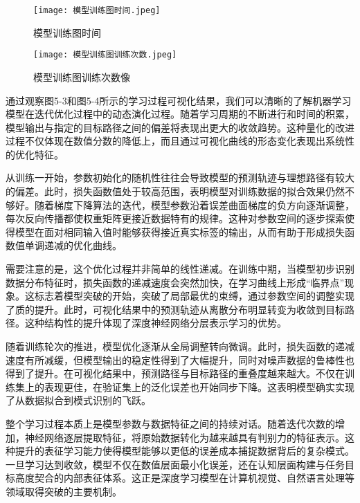 \begin{figure}[hbt]
	\centering
	\texttt{[image: 模型训练图时间.jpeg]}
	\caption{模型训练图时间}
	\label{f.example}
\end{figure}


\begin{figure}[hbt]
	\centering
	\texttt{[image: 模型训练图训练次数.jpeg]}
	\caption{模型训练图训练次数像}
	\label{f.example}
\end{figure}

通过观察图5-3和图5-4所示的学习过程可视化结果，我们可以清晰的了解机器学习模型在迭代优化过程中的动态演化过程。随着学习周期的不断进行和时间的积累，模型输出与指定的目标路径之间的偏差将表现出更大的收敛趋势。这种量化的改进过程不仅体现在数值分数的降低上，而且通过可视化曲线的形态变化表现出系统性的优化特征。

从训练一开始，参数初始化的随机性往往会导致模型的预测轨迹与理想路径有较大的偏差。此时，损失函数值处于较高范围，表明模型对训练数据的拟合效果仍然不够好。随着梯度下降算法的迭代，模型参数沿着误差曲面梯度的负方向逐渐调整，每次反向传播都使权重矩阵更接近数据特有的规律。这种对参数空间的逐步探索使得模型在面对相同输入值时能够获得接近真实标签的输出，从而有助于形成损失函数值单调递减的优化曲线。


需要注意的是，这个优化过程并非简单的线性递减。在训练中期，当模型初步识别数据分布特征时，损失函数的递减速度会突然加快，在学习曲线上形成“临界点”现象。这标志着模型突破的开始，突破了局部最优的束缚，通过参数空间的调整实现了质的提升。此时，可视化结果中的预测轨迹从离散分布明显转变为收敛到目标路径。这种结构性的提升体现了深度神经网络分层表示学习的优势。

随着训练轮次的推进，模型优化逐渐从全局调整转向微调。此时，损失函数的递减速度有所减缓，但模型输出的稳定性得到了大幅提升，同时对噪声数据的鲁棒性也得到了提升。在可视化结果中，预测路径与目标路径的重叠度越来越大。不仅在训练集上的表现更佳，在验证集上的泛化误差也开始同步下降。这表明模型确实实现了从数据拟合到模式识别的飞跃。

整个学习过程本质上是模型参数与数据特征之间的持续对话。随着迭代次数的增加，神经网络逐层提取特征，将原始数据转化为越来越具有判别力的特征表示。这种提升的表征学习能力使得模型能够以更低的误差成本捕捉数据背后的复杂模式。一旦学习达到收敛，模型不仅在数值层面最小化误差，还在认知层面构建与任务目标高度契合的内部表征体系。这正是深度学习模型在计算机视觉、自然语言处理等领域取得突破的主要机制。








